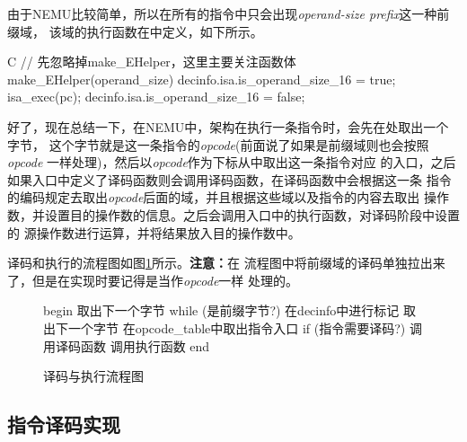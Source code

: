 由于NEMU比较简单，所以在所有的指令中只会出现\emph{operand-size prefix}这一种前缀域，
该域的执行函数在中定义，如下所示。
\begin{codes*}{C}
// 先忽略掉make_EHelper，这里主要关注函数体
make_EHelper(operand_size) {
  decinfo.isa.is_operand_size_16 = true;
  isa_exec(pc);
  decinfo.isa.is_operand_size_16 = false;
}
\end{codes*}

好了，现在总结一下，在NEMU中，\arch 架构在执行一条指令时，会先在\pc 处取出一个字节，
这个字节就是这一条指令的\emph{opcode}(前面说了如果是前缀域则也会按照\emph{opcode}
一样处理)，然后以\emph{opcode}作为下标从中取出这一条指令对应
的入口，之后如果入口中定义了译码函数则会调用译码函数，在译码函数中会根据这一条
指令的编码规定去取出\emph{opcode}后面的域，并且根据这些域以及指令的内容去取出
操作数，并设置目的操作数的信息。之后会调用入口中的执行函数，对译码阶段中设置的
源操作数进行运算，并将结果放入目的操作数中。

\arch 译码和执行的流程图如图\ref{fig:x86-idex-flowchart}所示。\textbf{注意：}在
流程图中将前缀域的译码单独拉出来了，但是在实现时要记得是当作\emph{opcode}一样
处理的。

\begin{figure}[!htbp]
\centering
\begin{autoflow}
begin
取出下一个字节
while (是前缀字节?)
{
  在decinfo中进行标记
  取出下一个字节
}
在opcode_table中取出指令入口
if (指令需要译码?)
{
  调用译码函数
}
调用执行函数
end
\end{autoflow}
\caption{\arch 译码与执行流程图}\label{fig:x86-idex-flowchart}
\end{figure}

\subsection{\arch 指令译码实现}

